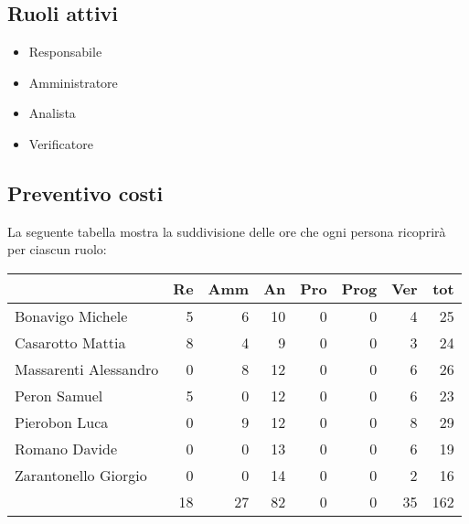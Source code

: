 \subsection{Ruoli attivi}
\begin{itemize}
    \item Responsabile 
    \item Amministratore 
    \item Analista 
    \item Verificatore
\end{itemize}

\subsection{Preventivo costi}

La seguente tabella mostra la suddivisione delle ore che ogni persona ricoprirà per ciascun ruolo:

\begin{table}[H]
    \begin{tabularx}{\linewidth}{X|rrrrrrr}
    \rowcolor{gray!30}& Re & Amm & An & Pro & Prog & Ver & tot \\
    \hline
    Bonavigo Michele                        & 5 & 6 & 10 & 0 & 0 & 4 & 25 \\
    \rowcolor{gray!10}Casarotto Mattia      & 8 & 4 & 9 & 0 & 0 & 3 & 24 \\
    Massarenti Alessandro                   & 0 & 8 & 12 & 0 & 0 & 6 & 26 \\
    \rowcolor{gray!10}Peron Samuel          & 5 & 0 & 12 & 0 & 0 & 6 & 23 \\
    Pierobon Luca                           & 0 & 9 & 12 & 0 & 0 & 8 & 29 \\
    \rowcolor{gray!10}Romano Davide         & 0 & 0 & 13 & 0 & 0 & 6 & 19 \\
    Zarantonello Giorgio                    & 0 & 0 & 14 & 0 & 0 & 2 & 16 \\
    \hline                                  & 18 & 27 & 82 & 0 & 0 & 35 & 162 \\ 
    \end{tabularx}
\end{table}

